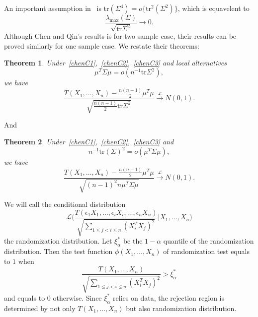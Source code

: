 \documentclass[review]{elsarticle}
\theoremstyle{plain}
\newtheorem{theorem}{\quad\quad Theorem}
\theoremstyle{definition}
\theoremstyle{remark}
\begin{document}
An important assumption in~\cite{Chen2010A} is
    $\mathrm{tr}(\Sigma^4)=o\{\mathrm{tr}^2(\Sigma^2)\}$,
which is equavelent to 
\begin{equation}\label{chenC3}
    \frac{\lambda_{\max}(\Sigma)}{\sqrt{\mathrm{tr}\Sigma^2}}\to 0.
\end{equation}
Although Chen and Qin's results is for two sample case, their results can be proved similarly for one sample case. We restate their theorems:
\begin{theorem}\label{theoremChen}
    Under~\eqref{chenC1},~\eqref{chenC2},~\eqref{chenC3} and local alternatives
    \begin{equation}\label{mu1}
        \mu^T \Sigma\mu=o(n^{-1}\mathrm{tr}\Sigma^2),
    \end{equation}
    we have
    \begin{equation}
        \frac{T(X_1,\ldots,X_n)-\frac{n(n-1)}{2}\mu^T\mu}{\sqrt{\frac{n(n-1)}{2}\mathrm{tr}\Sigma^2}}\xrightarrow{\mathcal{L}}N(0,1).
    \end{equation}
\end{theorem}
And
\begin{theorem}\label{theoremChen2}
    Under~\eqref{chenC1},~\eqref{chenC2},~\eqref{chenC3} and     \begin{equation}\label{mumu1}
     n^{-1}\mathrm{tr}(\Sigma)^2   =o(\mu^T \Sigma\mu),
    \end{equation}
    we have
    \begin{equation}
        \frac{T(X_1,\ldots,X_n)-\frac{n(n-1)}{2}\mu^T\mu}{\sqrt{{(n-1)}^2 n \mu^T \Sigma\mu}}\xrightarrow{\mathcal{L}}N(0,1).
    \end{equation}
\end{theorem}

We will call the conditional distribution
\begin{equation*}
        \mathcal{L}\Big(\frac{T(\epsilon_1 X_1,\ldots, \epsilon_i X_i,\ldots,\epsilon_n X_n)}{\sqrt{\sum_{1\leq j<i\leq n}{(X_i^T X_j)}^2}}\Big|X_1,\ldots,X_n\Big)
\end{equation*}
the randomization distribution.
Let $\xi^*_{\alpha}$ be the $1-\alpha$ quantile of the randomization distribution.
Then the test function $\phi(X_1,\ldots,X_n)$ of randomization test equals to $1$ when 
$$
\frac{T(X_1,\ldots, X_n)}{\sqrt{\sum_{1\leq j<i\leq n}{(X_i^T X_j)}^2}}> \xi^*_{\alpha}
$$
and equals to $0$ otherwise.
Since $\xi^*_{\alpha}$ relies on data, the rejection region is determined by not only  $T(X_1,\ldots,X_n)$ but also randomization distribution.
\end{document}
